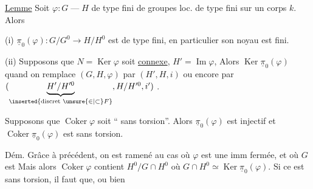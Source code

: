 

\uline{Lemme} Soit $\varphi:G\mathbin{\text{---}}H$  de type fini de groupes loc. de type fini sur un corps $k$. Alors

(i) $\underline{\pi}_0(\varphi):G/G^0\longrightarrow H/H^0$ est de type fini, en particulier son noyau est fini.


\deleted{[Si $N=\operatorname{Ker}\varphi$ est connexe, alors $\underline{\pi}_0(\varphi)$ est $\unsure{\simeq}$ une immersion fermée]}

(ii) Supposons que $N=\operatorname{Ker}\varphi$ soit \uline{connexe},  $H'=\operatorname{Im}\varphi$,  Alors $\operatorname{Ker}\underline{\pi}_0(\varphi)$
quand on remplace $(G,H,\varphi)$ par $(H',H,i)$ ou encore par $(\underbrace{H'/H'^0}_{\inserted{\text{discret }\unsure{\in|\subset}F}},H/H'^0,i')$ \unsure{\ldots}.

  Supposons  que $\operatorname{Coker}\varphi$ soit `` sans torsion''. Alors $\underline{\pi}_0(\varphi)$ est injectif et $\operatorname{Coker}\underline{\pi}_0(\varphi)$ est sans torsion.


Dém. Grâce à  précédent, on est ramené au cas où $\varphi$ est une imm fermée, et où $G$ est  Mais alors $\operatorname{Coker}\varphi$ contient $H^0/G\cap H^0$ où $G\cap H^0\simeq\operatorname{Ker}\underline{\pi}_0(\varphi)$. Si ce  est sans torsion, il faut que, ou bien

